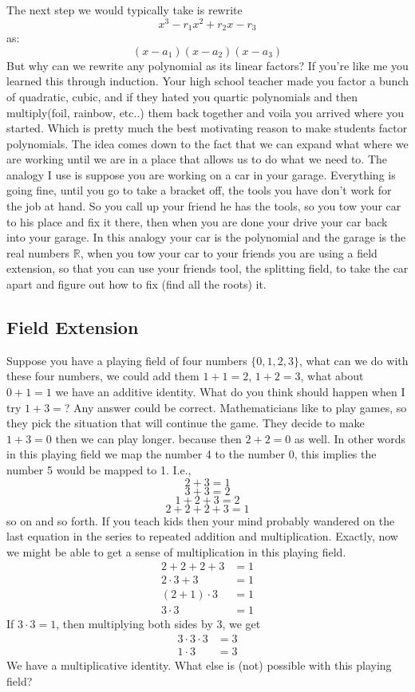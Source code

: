 \documentclass[12pt]{article}
\begin{document}
The next step we would typically take is rewrite $$x^3 -r_1 x^2 +r_2 x - r_3$$ as: $$(x-a_1)(x-a_2)(x-a_3)$$  But why can we rewrite any polynomial as its linear factors?  If you're like me you learned this through induction.  Your high school teacher made you factor a bunch of quadratic, cubic, and if they hated you quartic polynomials and then multiply(foil, rainbow, etc..) them back together and voila you arrived where you started.  Which is pretty much the best motivating reason to make students factor polynomials.  The idea comes down to the fact that we can expand what where we are working until we are in a place that allows us to do what we need to.  The analogy I use is suppose you are working on a car in your garage.  Everything is going fine, until you go to take a bracket off, the tools you have don't work for the job at hand.  So you call up your friend he has the tools, so you tow your car to his place and fix it there, then when you are done your drive your car back into your garage.  In this analogy your car is the polynomial and the garage is the real numbers $\mathbb{R}$, when you tow your car to your friends you are using a field extension, so that you can use your friends tool, the splitting field, to take the car apart and figure out how to fix (find all the roots) it.

\subsection*{Field Extension}
Suppose you have a playing field of four numbers $\{0, 1, 2, 3\}$, what can we do with these four numbers, we could add them $1+1=2$, $1+2=3$, what about $0+1=1$  we have an additive identity.  What do you think should happen when I try $1+3=$?  Any answer could be correct.  Mathematicians like to play games, so they pick the situation that will continue the game.  They decide to make $1+3=0$ then we can play longer. because then $2+2=0$ as well.  In other words in this playing field we map the number 4 to the number 0, this implies the number 5 would be mapped to 1.  I.e., $$2+3=1$$ $$3+3=2$$ $$1+2+3=2$$ $$2+2+2+3=1$$ so on and so forth.  If you teach kids then your mind probably wandered on the last equation in the series to repeated addition and multiplication.  Exactly, now we might be able to get a sense of multiplication in this playing field.
\begin{align*}
2+2+2+3 &=1 \\
2 \cdot 3 +3 &= 1 \\
(2+1) \cdot 3 &= 1 \\
3 \cdot 3 &= 1
\end{align*}
If $3 \cdot 3 = 1$, then multiplying both sides by 3, we get
\begin{align*}
3 \cdot 3 \cdot 3 &= 3 \\
1 \cdot 3 &= 3
\end{align*}
We have a multiplicative identity.  What else is (not) possible with this playing field?\\
\end{document}
